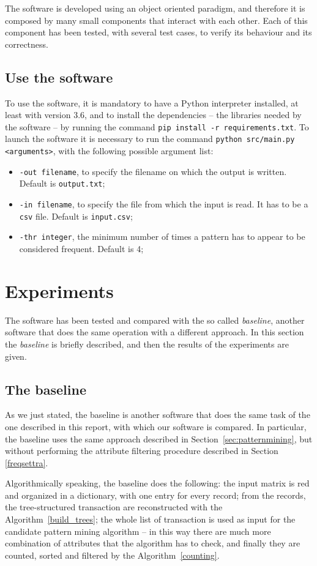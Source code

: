 \documentclass{acm_proc_article-sp-sigmod09}
\begin{document}
The software is developed using an object oriented paradigm, and therefore it is composed by many small components that interact with each other. Each of this component has been tested, with several test cases, to verify its behaviour and its correctness.

\subsection{Use the software}
To use the software, it is mandatory to have a Python interpreter installed, at least with version 3.6, and to install the dependencies -- the libraries needed by the software -- by running the command \texttt{pip install -r requirements.txt}. To launch the software it is necessary to run the command \texttt{python src/main.py <arguments>}, with the following possible argument list:
\begin{itemize}
\item \texttt{-out filename}, to specify the filename on which the output is written. Default is \texttt{output.txt};
\item \texttt{-in filename}, to specify the file from which the input is read. It has to be a \texttt{csv} file. Default is \texttt{input.csv};
\item \texttt{-thr integer}, the minimum number of times a pattern has to appear to be considered frequent. Default is 4;
\end{itemize}
 
\section{Experiments}
The software has been tested and compared with the so called \emph{baseline}, another software that does the same operation with a different approach. In this section the \emph{baseline} is briefly described, and then the results of the experiments are given.

\subsection{The baseline}
As we just stated, the baseline is another software that does the same task of the one described in this report, with which our software is compared. In particular, the baseline uses the same approach described in Section~\ref{sec:patternmining}, but without performing the attribute filtering procedure described in Section \ref{freqsettra}.

Algorithmically speaking, the baseline does the following: the input matrix is red and organized in a dictionary, with one entry for every record; from the records, the tree-struc\-tu\-red transaction are reconstructed with the Algorithm~\ref{build_trees}; the whole list of transaction is used as input for the candidate pattern mining algorithm -- in this way there are much more combination of attributes that the algorithm has to check, and finally they are counted, sorted and filtered by the Algorithm~\ref{counting}.
\end{document}
